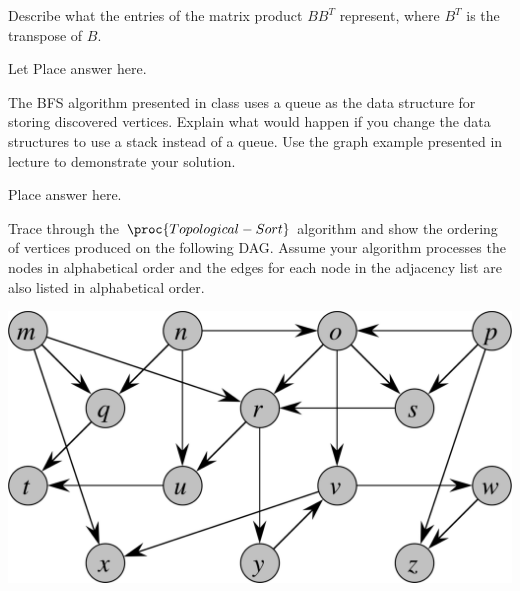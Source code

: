 \documentclass[addpoints,11pt]{exam}
\begin{document}
\begin{questions}
Describe what the entries of the matrix product $BB^T$ represent, where $B^T$ is the transpose of $B$.
\begin{solutionorbox}

    Let 
	Place answer here.
\end{solutionorbox}

\newpage


\question[10]
The BFS algorithm presented in class uses a queue as the data structure for storing discovered vertices.  Explain what would happen if you change the data structures to use a stack instead of a queue.  Use the graph example presented in lecture to demonstrate your solution.   
\begin{solutionorbox}
	Place answer here.
\end{solutionorbox}
	
\newpage



%
%
%
\question[10]
Trace through the $\proc{Topological-Sort}$ algorithm and show the ordering of vertices produced on the following DAG.  Assume your  algorithm processes the nodes in alphabetical order and the edges for each node in the adjacency list are also listed in alphabetical order.\\
\begin{center}
\includegraphics[scale=0.10]{Fig_05a.pdf}
\end{center}  


\end{questions}
\end{document}
